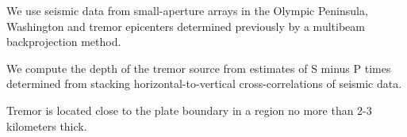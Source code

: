 \documentclass[draft]{agujournal2019}
\begin{document}



\begin{keypoints}
\item We use seismic data from small-aperture arrays in the Olympic Peninsula, Washington and tremor epicenters determined previously by a multibeam backprojection method. 
\item We compute the depth of the tremor source from estimates of S minus P times determined from stacking horizontal-to-vertical cross-correlations of seismic data.
\item Tremor is located close to the plate boundary in a region no more than 2-3 kilometers thick.
\end{keypoints}

%
%

%
%

\end{document}
